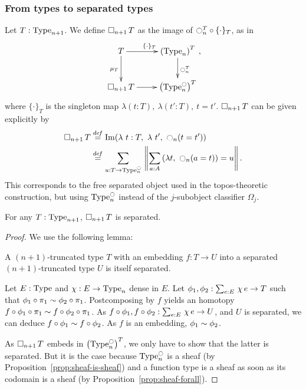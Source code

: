 \subsubsection{From types to separated types}
\label{sssec:type_to_sep}


Let $T : \operatorname{Type}_{n+1}$. We define $\mathop{\square_{n+1}} T$ as the image of
$\ocircle_n^T \circ \{\cdot\}_T$, as in
\[\xymatrix{
    T \ar[r]^{\{\cdot\}_T} \ar[d]_{\mu_T} & \left(\Type_n\right)^T \ar[d]^{\modal_n^T} \\
  \separated T \ar[r]& \left( \Type_n^\modal \right)^T
}, \]%
where $\{\cdot\}_T$ is the singleton map $\lambda (t:T),~\lambda
(t':T),~t=t'$. 
%
$\mathop{\square_{n+1}} T$ can be given explicitly by
%
\begin{align*}
\mathop{\square_{n+1}} T &\overset{de\hspace{-0.2ex}f}{=} \operatorname{Im} (\lambda~t:T,~\lambda~ t',~ \ocircle_n (t = t')) \\
          &\overset{de\hspace{-0.2ex}f}{=} \sum_{u:T \to \operatorname{Type}_n^{\ocircle}}\, \left\| \sum_{a:A}\, (\lambda t,~\ocircle_n (a=t)) = u\right\|.
\end{align*}
%
This corresponds to the free separated object used in the topos-theoretic construction, but using $\operatorname{Type}_n^{\ocircle}$ instead of the
$j$-subobject classifier $\Omega_j$.
%
\begin{prop}
  For any $T:\operatorname{Type}_{n+1}$, $\mathop{\square_{n+1}} T$ is separated.  
\end{prop}

\begin{proof}
We use the following lemma:
\begin{lem}
\label{lem:embed-sep}
  A $(n+1)$-truncated type $T$ with an embedding $f : T \to U$
  into a separated $(n+1)$-truncated type $U$ is itself separated.
\end{lem}
\begin{prooflem}
  Let $E:\operatorname{Type}$ and $\chi:E\to\operatorname{Type}_n$ dense in $E$. Let
  $\phi_1,\phi_2:\sum_{e:E}\, \chi\, e \to T$ such that $\phi_1 \circ
  \pi_1 \sim \phi_2 \circ \pi_1$. Postcomposing by $f$ yields an homotopy $f \circ \phi_1 \circ
  \pi_1 \sim f \circ \phi_2 \circ \pi_1$. As $f\circ\phi_1,f\circ
  \phi_2 : \sum_{e:E}\, \chi\, e \to U$, and $U$ is separated, we can
  deduce $f \circ \phi_1 \sim f \circ \phi_2$. As $f$ is an
  embedding, $\phi_1 \sim \phi_2$.
\end{prooflem}
As $\mathop{\square_{n+1}} T$ embeds in $\left( \operatorname{Type}_n^{\ocircle} \right)^T$, we only
have to show that the latter is separated. But it is the case because
$\operatorname{Type}_n^{\ocircle}$ is a sheaf (by Proposition~\ref{prop:sheaf-is-sheaf})
and a function type is a sheaf as soon
as its codomain is a sheaf (by Proposition~\ref{prop:sheaf-forall}).
\end{proof}

